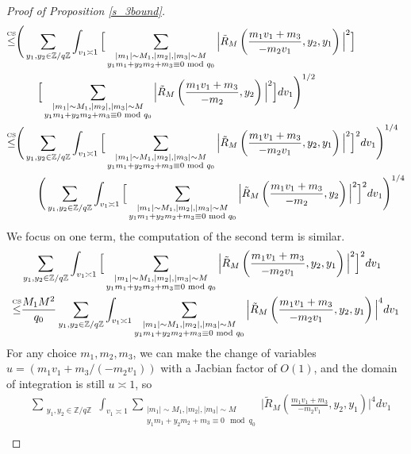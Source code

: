 \begin{proof}[{Proof of Proposition \ref{s_3bound}}]
\begin{align*}
    \stackon{CS}{\leq}&\Bigg(\sum_{\substack{y_1,y_2 \in\mathbb{Z}/q\mathbb{Z} }}\int_{v_1\asymp 1}\Big[\sum_{\substack{|m_1|\sim M_1,|m_2|,|m_3|\sim M\\ y_1m_1+y_2m_2+m_3\equiv 0 \mod q_0}}\Big|\tilde{R}_M\left(\frac{m_1v_1+m_3}{-m_2v_1},y_2,y_1\right)\Big|^2\Big]\\ & \quad \quad
   \Big[ \sum_{\substack{|m_1|\sim M_1,|m_2|,|m_3|\sim M\\ y_1m_1+y_2m_2+m_3\equiv 0 \mod q_0}}
    \Big|\tilde{R}_M\left(\frac{m_1v_1+m_3}{-m_2},y_2\right)\Big|^2\Big] dv_1\Bigg)^{1/2}\\
    \stackon{CS}{\leq}&\Bigg(\sum_{\substack{y_1,y_2 \in\mathbb{Z}/q\mathbb{Z} }}\int_{v_1\asymp 1}\Big[\sum_{\substack{|m_1|\sim M_1,|m_2|,|m_3|\sim M\\ y_1m_1+y_2m_2+m_3\equiv 0 \mod q_0}}\Big|\tilde{R}_M\left(\frac{m_1v_1+m_3}{-m_2v_1},y_2,y_1\right)\Big|^2\Big]^2dv_1\Bigg)^{1/4}\\ & \quad \quad
    \Bigg(\sum_{\substack{y_1,y_2 \in\mathbb{Z}/q\mathbb{Z} }}\int_{v_1\asymp 1}\Big[ \sum_{\substack{|m_1|\sim M_1,|m_2|,|m_3|\sim M\\ y_1m_1+y_2m_2+m_3\equiv 0 \mod q_0}}
     \Big|\tilde{R}_M\left(\frac{m_1v_1+m_3}{-m_2},y_2\right)\Big|^2\Big]^2 dv_1\Bigg)^{1/4}\\
    \end{align*}
    We focus on one term, the computation of the second term is similar. \begin{align*}
        &\sum_{\substack{y_1,y_2 \in\mathbb{Z}/q\mathbb{Z} }}\int_{v_1\asymp 1}\Big[\sum_{\substack{|m_1|\sim M_1,|m_2|,|m_3|\sim M\\ y_1m_1+y_2m_2+m_3\equiv 0 \mod q_0}}\Big|\tilde{R}_M\left(\frac{m_1v_1+m_3}{-m_2v_1},y_2,y_1\right)\Big|^2\Big]^2dv_1\\
        \stackon{CS}{\leq}&\frac{M_1M^2}{q_0}\sum_{\substack{y_1,y_2 \in\mathbb{Z}/q\mathbb{Z} }}\int_{v_1\asymp 1}\sum_{\substack{|m_1|\sim M_1,|m_2|,|m_3|\sim M\\ y_1m_1+y_2m_2+m_3\equiv 0 \mod q_0}}\Big|\tilde{R}_M\left(\frac{m_1v_1+m_3}{-m_2v_1},y_2,y_1\right)\Big|^4dv_1
    \end{align*}
    For any choice $m_1,m_2,m_3$, we can make the change of variables $u=(m_1v_1+m_3/(-m_2v_1))$ with a Jacbian factor of $O(1)$, and the domain of integration is still $u\asymp 1$, so \begin{align*}
        &\sum_{\substack{y_1,y_2 \in\mathbb{Z}/q\mathbb{Z} }}\int_{v_1\asymp 1}\sum_{\substack{|m_1|\sim M_1,|m_2|,|m_3|\sim M\\ y_1m_1+y_2m_2+m_3\equiv 0 \mod q_0}}\Big|\tilde{R}_M\left(\frac{m_1v_1+m_3}{-m_2v_1},y_2,y_1\right)\Big|^4dv_1\\

\end{align*}
\end{proof}
